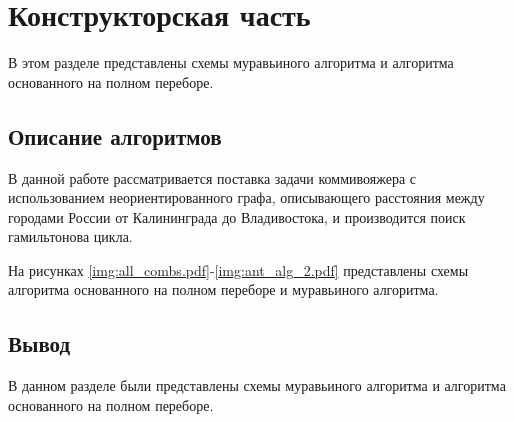 \chapter{Конструкторская часть}

В этом разделе представлены схемы муравьиного алгоритма и алгоритма основанного на полном переборе.

\section{Описание алгоритмов}
В данной работе рассматривается поставка задачи коммивояжера с использованием неориентированного графа, описывающего расстояния между городами России от Калининграда до Владивостока, и производится поиск гамильтонова цикла.

На рисунках \ref{img:all_combs.pdf}-\ref{img:ant_alg_2.pdf} представлены схемы алгоритма основанного на полном переборе и муравьиного алгоритма.

\FloatBarrier
{}
\FloatBarrier
{}
\FloatBarrier
{}
\FloatBarrier

\section*{Вывод}

В данном разделе были представлены схемы муравьиного алгоритма и алгоритма основанного на полном переборе.
\clearpage
